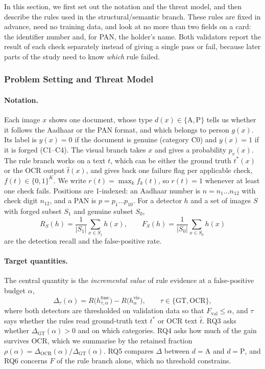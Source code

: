 \documentclass[12pt]{article}
\begin{document}
In this section, we first set out the notation and the threat model, and then describe the rules used in the structural/semantic branch. These rules are fixed in advance, need no training data, and look at no more than two fields on a card: the identifier number and, for PAN, the holder's name. Both validators report the result of each check separately instead of giving a single pass or fail, because later parts of the study need to know \emph{which} rule failed.

\subsubsection{Problem Setting and Threat Model}
\label{subsec:problem}

\paragraph*{Notation.} Each image $x$ shows one document, whose type $d(x) \in \{\mathrm{A}, \mathrm{P}\}$ tells us whether it follows the Aadhaar or the PAN format, and which belongs to person $g(x)$. Its label is $y(x)=0$ if the document is genuine (category C0) and $y(x)=1$ if it is forged (C1--C4). The visual branch takes $x$ and gives a probability $p_v(x)$. The rule branch works on a text $t$, which can be either the ground truth $t^*(x)$ or the OCR output $\hat{t}(x)$, and gives back one failure flag per applicable check, $f(t) \in \{0,1\}^K$. We write $r(t) = \max_k f_k(t)$, so $r(t)=1$ whenever at least one check fails. Positions are 1-indexed: an Aadhaar
number is $n=n_1\dots n_{12}$ with check digit $n_{12}$, and a PAN is
$p=p_1\dots p_{10}$. For a detector $h$ and a set of images $S$ with
forged subset $S_1$ and genuine subset $S_0$,
\begin{equation}
\label{eq:rates}
R_S(h)=\frac{1}{|S_1|}\sum_{x\in S_1} h(x),\qquad
F_S(h)=\frac{1}{|S_0|}\sum_{x\in S_0} h(x)
\end{equation}
are the detection recall and the false-positive rate.

\paragraph*{Target quantities.} The central quantity is the
\emph{incremental value} of rule evidence at a false-positive budget
$\alpha$,
\begin{equation}
\label{eq:delta}
\Delta_{\tau}(\alpha) = R\big(h^{\mathrm{fuse}}_{\tau,\alpha}\big) - R\big(h^{\mathrm{vis}}_{\alpha}\big),
\qquad \tau\in\{\mathrm{GT},\mathrm{OCR}\},
\end{equation}
where both detectors are thresholded on validation data so that
$F_{\mathrm{val}}\le\alpha$, and $\tau$ says whether the rules read
ground-truth text $t^{\ast}$ or OCR text $\hat{t}$. RQ3 asks whether
$\Delta_{\mathrm{GT}}(\alpha)>0$
and on which categories. RQ4 asks how much of the gain survives OCR,
which we summarise by the retained fraction
$\rho(\alpha)=\Delta_{\mathrm{OCR}}(\alpha)/\Delta_{\mathrm{GT}}(\alpha)$. RQ5
compares $\Delta$ between $d=\mathrm{A}$ and $d=\mathrm{P}$, and RQ6
concerns $F$ of the rule branch alone, which no threshold constrains.
\end{document}
